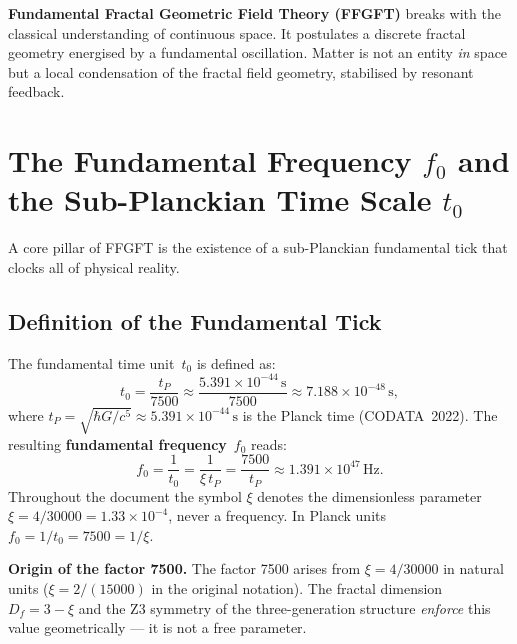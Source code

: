 \textbf{Fundamental Fractal Geometric Field Theory (FFGFT)} breaks with
the classical understanding of continuous space. It postulates a discrete
fractal geometry energised by a fundamental oscillation. Matter is not
an entity \emph{in} space but a local condensation of the fractal field
geometry, stabilised by resonant feedback.

\section{The Fundamental Frequency $f_0$ and the Sub-Planckian Time Scale $t_0$}

A core pillar of FFGFT is the existence of a sub-Planckian fundamental
tick that clocks all of physical reality.

\subsection{Definition of the Fundamental Tick}

The fundamental time unit~$t_0$ is defined as:
\begin{equation}
  t_0 = \frac{t_P}{7500}
      \approx \frac{5.391 \times 10^{-44}\,\text{s}}{7500}
      \approx 7.188 \times 10^{-48}\,\text{s},
  \label{eq:t0}
\end{equation}
where $t_P = \sqrt{\hbar G/c^5} \approx 5.391 \times 10^{-44}\,\text{s}$
is the Planck time (CODATA~2022). The resulting \textbf{fundamental
frequency}~$f_0$ reads:
\begin{equation}
  f_0 = \frac{1}{t_0} = \frac{1}{\xi\,t_P} = \frac{7500}{t_P}
      \approx 1.391 \times 10^{47}\,\text{Hz}.
  \label{eq:xi}
\end{equation}
Throughout the document the symbol $\xi$ denotes the dimensionless
parameter $\xi = 4/30000 = 1.33\times 10^{-4}$, never a frequency.
In Planck units $f_0 = 1/t_0 = 7500 = 1/\xi$.

\begin{keybox}
\textbf{Origin of the factor 7500.}\;
The factor 7500 arises from $\xi = 4/30000$ in natural units
($\xi = 2/(15000)$ in the original notation). The fractal dimension
$D_f = 3 - \xi$ and the Z3 symmetry of the three-generation structure
\emph{enforce} this value geometrically — it is not a free parameter.
\end{keybox}

